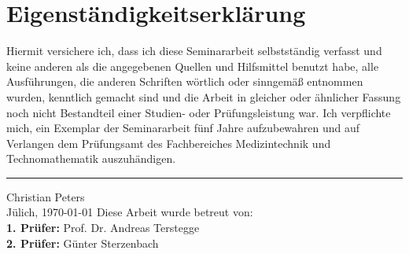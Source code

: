 \chapter*{Eigenständigkeitserklärung}
Hiermit versichere ich, dass ich diese Seminararbeit selbstst\"andig verfasst
und keine anderen als die angegebenen Quellen und Hilfsmittel benutzt habe,
alle Ausf\"uhrungen, die anderen Schriften w\"ortlich oder sinngem\"a{\ss} 
entnommen wurden, kenntlich gemacht sind und die Arbeit in gleicher oder
\"ahnlicher Fassung noch nicht Bestandteil einer Studien- oder
Pr\"ufungsleistung war. Ich verpflichte mich, ein Exemplar der Seminararbeit
f\"unf Jahre aufzubewahren und auf Verlangen dem Pr\"ufungsamt des
Fachbereiches Medizintechnik und Technomathematik auszuh\"andigen.
\vspace{1.5cm}
{\hrule width 6cm} 
\vspace{1ex}
\noindent{}Christian Peters\\
Jülich, \today
\vfill
\noindent{}Diese Arbeit wurde betreut von:\\
{\bfseries 1. Prüfer:} Prof. Dr. Andreas Terstegge\\
{\bfseries 2. Prüfer:} G\"unter Sterzenbach
